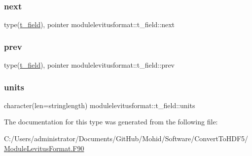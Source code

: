 \subsubsection{\texorpdfstring{next}{next}}
{\footnotesize\ttfamily type(\mbox{\hyperlink{structmodulelevitusformat_1_1t__field}{t\+\_\+field}}), pointer modulelevitusformat\+::t\+\_\+field\+::next\hspace{0.3cm}{\ttfamily [private]}}

\mbox{\label{structmodulelevitusformat_1_1t__field_a0da8b4d12af7831a21660cbcfc75a7e4}} 
\subsubsection{\texorpdfstring{prev}{prev}}
{\footnotesize\ttfamily type(\mbox{\hyperlink{structmodulelevitusformat_1_1t__field}{t\+\_\+field}}), pointer modulelevitusformat\+::t\+\_\+field\+::prev\hspace{0.3cm}{\ttfamily [private]}}

\mbox{\label{structmodulelevitusformat_1_1t__field_a910648a1022392862cfe0252e0cf5c25}} 
\subsubsection{\texorpdfstring{units}{units}}
{\footnotesize\ttfamily character(len=stringlength) modulelevitusformat\+::t\+\_\+field\+::units\hspace{0.3cm}{\ttfamily [private]}}



The documentation for this type was generated from the following file\+:\begin{DoxyCompactItemize}
\item 
C\+:/\+Users/administrator/\+Documents/\+Git\+Hub/\+Mohid/\+Software/\+Convert\+To\+H\+D\+F5/\mbox{\hyperlink{_module_levitus_format_8_f90}{Module\+Levitus\+Format.\+F90}}\end{DoxyCompactItemize}
